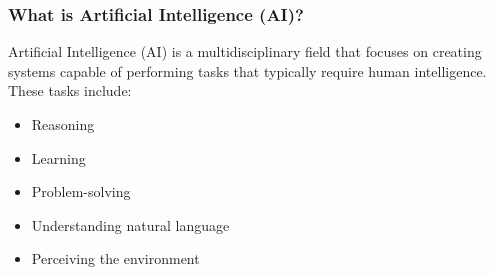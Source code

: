 \documentclass[aspectratio=169]{beamer}
\begin{document}
\begin{frame}[fragile]
    \frametitle{What is Artificial Intelligence (AI)?}
    
    Artificial Intelligence (AI) is a multidisciplinary field that focuses on creating systems capable of performing tasks that typically require human intelligence. These tasks include:
    \begin{itemize}
        \item Reasoning
        \item Learning
        \item Problem-solving
        \item Understanding natural language
        \item Perceiving the environment
    \end{itemize}
    
\end{frame}
\end{document}
